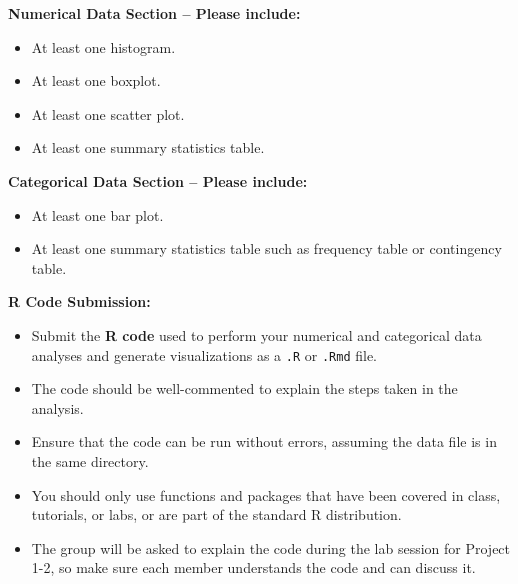 \vspace{6pt}
\noindent \textbf{Numerical Data Section – Please include:}
\begin{itemize}
    \item At least one histogram.
    \item At least one boxplot.
    \item At least one scatter plot.
    \item At least one summary statistics table.
\end{itemize}

\vspace{6pt}
\noindent \textbf{Categorical Data Section – Please include:}
\begin{itemize}
    \item At least one bar plot.
    \item At least one summary statistics table such as frequency table or contingency table.
\end{itemize}

\vspace{6pt}
\noindent \textbf{R Code Submission:}
\begin{itemize}
    \item Submit the \textbf{R code} used to perform your numerical and categorical data analyses and generate visualizations as a \texttt{.R} or \texttt{.Rmd} file.
    \item The code should be well-commented to explain the steps taken in the analysis.
    \item Ensure that the code can be run without errors, assuming the data file is in the same directory.
    \item You should only use functions and packages that have been covered in class, tutorials, or labs, or are part of the standard R distribution.
    \item The group will be asked to explain the code during the lab session for Project 1-2, so make sure each member understands the code and can discuss it.
\end{itemize}
